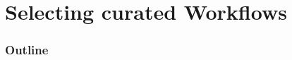\section{Selecting curated Workflows}

\begin{frame}
    \frametitle{Outline}
    \begin{columns}[t]
        \begin{column}{.5\textwidth}
            \tableofcontents[sections={1-9},currentsection]
        \end{column}
        \begin{column}{.5\textwidth}
            \tableofcontents[sections={10-18},currentsection]
        \end{column}
    \end{columns}
\end{frame}

%

